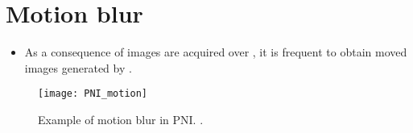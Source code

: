 \section{Motion blur}
\begin{itemize}
\item As a consequence of images are acquired over , it is frequent to obtain
  moved images generated by .
\end{itemize}
\vspace{-4ex}
\begin{figure}[!b]
  \centering
  \texttt{[image: PNI\_motion]}
  \caption{Example of motion blur in \gls{PNI}.
    \cite{naddaf2004technical}.}
  \label{PNI_motion}
\end{figure}
